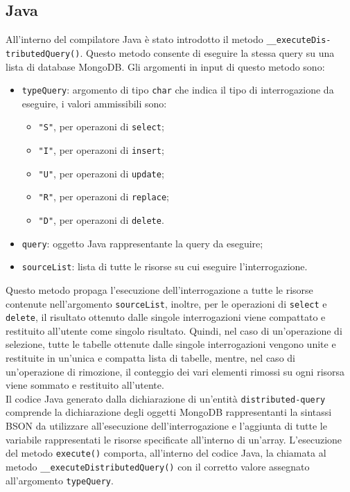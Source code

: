 \subsection{Java}
All'interno del compilatore Java è stato introdotto il metodo \verb|__executeDis-| \verb|tributedQuery()|. Questo metodo consente di eseguire la stessa query su una lista di database MongoDB. Gli argomenti in input di questo metodo sono:
\begin{itemize}
    \item \verb|typeQuery|: argomento di tipo \verb|char| che indica il tipo di interrogazione da eseguire, i valori ammissibili sono:
    \begin{itemize}
        \item \verb|"S"|, per operazoni di \verb|select|;
        \item \verb|"I"|, per operazoni di \verb|insert|;
        \item \verb|"U"|, per operazoni di \verb|update|;
        \item \verb|"R"|, per operazoni di \verb|replace|;
        \item \verb|"D"|, per operazoni di \verb|delete|.
    \end{itemize}
    \item \verb|query|: oggetto Java rappresentante la query da eseguire;
    \item \verb|sourceList|: lista di tutte le risorse su cui eseguire l'interrogazione.
\end{itemize}
Questo metodo propaga l'esecuzione dell'interrogazione a tutte le risorse contenute nell'argomento \verb|sourceList|, inoltre, per le operazioni di \verb|select| e \verb|delete|, il risultato ottenuto dalle singole interrogazioni viene compattato e restituito all'utente come singolo risultato. Quindi, nel caso di un'operazione di selezione, tutte le tabelle ottenute dalle singole interrogazioni vengono unite e restituite in un'unica e compatta lista di tabelle, mentre, nel caso di un'operazione di rimozione, il conteggio dei vari elementi rimossi su ogni risorsa viene sommato e restituito all'utente. \\
Il codice Java generato dalla dichiarazione di un'entità \verb|distributed-query| comprende la dichiarazione degli oggetti MongoDB rappresentanti la sintassi BSON da utilizzare all'esecuzione dell'interrogazione e l'aggiunta di tutte le variabile rappresentati le risorse specificate all'interno di un'array. L'esecuzione del metodo \verb|execute()| comporta, all'interno del codice Java, la chiamata al metodo \verb|__executeDistributedQuery()| con il corretto valore assegnato all'argomento \verb|typeQuery|. \\
